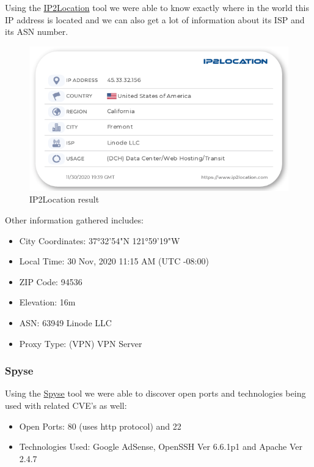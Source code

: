 Using the \href{https://www.ip2location.com/demo}{IP2Location} tool we were able to know exactly where in the world this IP address is located and we can also get a lot of information about its ISP and its ASN number.

\vspace{3cm}

\begin{figure}[ht!]
 	\centering
 	\includegraphics[width=0.7\linewidth]{img/ip2location45.png}
 	\caption{IP2Location result}
 \end{figure}

Other information gathered includes:
 \begin{itemize}
    \item City Coordinates: 37°32'54"N    121°59'19"W
    \item Local Time: 30 Nov, 2020 11:15 AM (UTC -08:00)
    \item ZIP Code: 94536
    \item Elevation: 16m
    \item ASN: 63949 Linode LLC
    \item Proxy Type: (VPN) VPN Server
 \end{itemize}

\subsubsection{Spyse}

Using the \href{https://spyse.com/target/ip/45.33.32.156}{Spyse} tool we were able to discover open ports and technologies being used with related CVE's as well: 
 
 \begin{itemize}
    \item Open Ports: 80 (uses http protocol) and 22
    \item Technologies Used: Google AdSense, OpenSSH Ver 6.6.1p1 and Apache Ver 2.4.7  
 \end{itemize}
 
